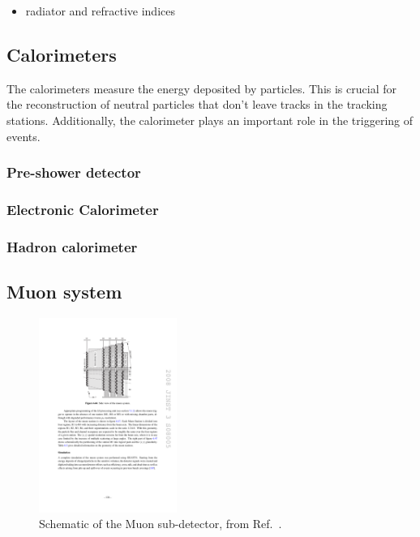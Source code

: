 \subsubsection{\richtwo}

{\color{Red}
\begin{itemize}
\item radiator and refractive indices 
\end{itemize}
}

\subsection{Calorimeters}

The calorimeters measure the energy deposited by particles. This is crucial for the reconstruction of neutral particles that don't leave tracks in the tracking stations. Additionally, the calorimeter plays an important role in the triggering of events.

\subsubsection{Pre-shower detector}
\subsubsection{Electronic Calorimeter}
\subsubsection{Hadron calorimeter}

\subsection{Muon system}

\begin{figure}[!h]
    \centering
    \includegraphics[width=0.4\textwidth]{figs/Detector/muon_layout.pdf}
    \caption{Schematic of the Muon sub-detector, from Ref.~\cite{Alves:2008zz}.}
    \label{fig:Dec_muon_schematic}   
\end{figure}

